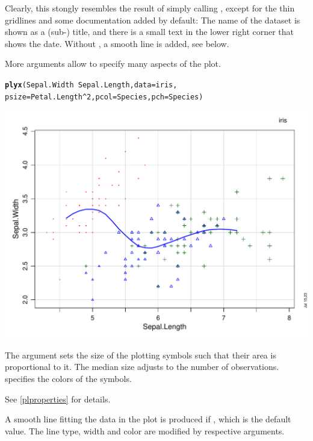 \documentclass[11pt]{article}\usepackage[]{graphicx}\usepackage[]{color}
\makeatletter
\def\maxwidth{ %
  \ifdim\Gin@nat@width>\linewidth
    \linewidth
  \else
    \Gin@nat@width
  \fi
}
\newcommand{\hlnum}[1]{\textcolor[rgb]{0.686,0.059,0.569}{#1}}%
\newcommand{\hlopt}[1]{\textcolor[rgb]{0,0,0}{#1}}%
\newcommand{\hlstd}[1]{\textcolor[rgb]{0.345,0.345,0.345}{#1}}%
\newcommand{\hlkwc}[1]{\textcolor[rgb]{0.333,0.667,0.333}{#1}}%
\newcommand{\hlkwd}[1]{\textcolor[rgb]{0.737,0.353,0.396}{\textbf{#1}}}%
\newenvironment{kframe}{%
 \def\at@end@of@kframe{}%
 \ifinner\ifhmode%
  \def\at@end@of@kframe{\end{minipage}}%
  \begin{minipage}{\columnwidth}%
 \fi\fi%
 \def\FrameCommand##1{\hskip\@totalleftmargin \hskip-\fboxsep
 \colorbox{shadecolor}{##1}\hskip-\fboxsep
     \hskip-\linewidth \hskip-\@totalleftmargin \hskip\columnwidth}%
 \MakeFramed {\advance\hsize-\width
   \@totalleftmargin\z@ \linewidth\hsize
   \@setminipage}}%
 {\par\unskip\endMakeFramed%
 \at@end@of@kframe}
\newenvironment{knitrout}{}{} %
\makeatother
\begin{document}
Clearly, this stongly resembles the result of simply calling , 
except for the thin gridlines and some documentation added by default: 
The name of the dataset is shown as a (sub-) title, and there is a small
text in the lower right corner that shows the date.
Without , a smooth line is added, see below.

More arguments allow to specify many aspects of the plot.
\begin{knitrout}
\color{fgcolor}\begin{kframe}
\begin{alltt}
\hlkwd{plyx}\hlstd{(Sepal.Width}\hlopt{~}\hlstd{Sepal.Length,} \hlkwc{data}\hlstd{=iris,}
     \hlkwc{psize}\hlstd{=Petal.Length}\hlopt{^}\hlnum{2}\hlstd{,} \hlkwc{pcol}\hlstd{=Species,} \hlkwc{pch}\hlstd{=Species)}
\end{alltt}
\end{kframe}
\includegraphics[width=\maxwidth]{figure/plyx_pchar-1} 
\end{knitrout}

The argument  sets the size of the plotting symbols
such that their area is proportional to it.
The median size %
adjusts to the number of observations.
 specifies the colors of the symbols.

See \ref{plproperties} for details.

A smooth line fitting the data in the plot is produced if 
, which is the default value. 
The line type, width and color are modified by respective arguments.
\end{document}
